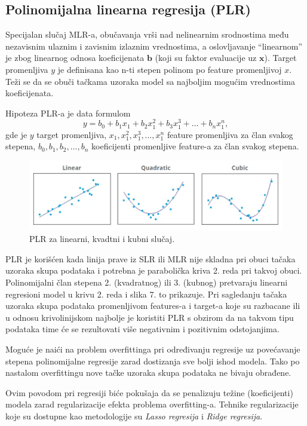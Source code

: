 \documentclass[fontsize=12bp, paper=a4]{scrarticle}
\begin{document}
\newpage
\subsection{Polinomijalna linearna regresija (PLR)}
Specijalan slučaj MLR-a, obučavanja vrši nad nelinearnim srodnostima među nezavisnim ulaznim i zavisnim izlaznim vrednostima, a oslovljavanje ``linearnom'' je zbog linearnog odnosa koeficijenata $\textbf{b}$ (koji su faktor evaluacije uz $\textbf{x}$). Target promenljiva $y$ je definisana kao n-ti stepen polinom po feature promenljivoj $x$. Teži se da se obuči tačkama uzoraka model sa najboljim mogućim vrednostima koeficijenata.

Hipoteza PLR-a je data formulom
$$ y = b_0 + b_1x_1 + b_2x_1^2 + b_3x_1^3 + \dots + b_nx_1^n,$$
gde je $y$ target promenljiva, $x_1, x_1^2, x_1^3, \dots, x_1^n$ feature promenljiva za član svakog stepena, $b_0, b_1, b_2, \dots, b_n$ koeficijenti promenljive feature-a za član svakog stepena.

\begin{figure}[h!]
    \centering
    \includegraphics[width=1\textwidth]{7.png}
    \caption{\centering PLR za linearni, kvadtni i kubni slučaj.}
\end{figure}

PLR je korišćen kada linija prave iz SLR ili MLR nije skladna pri obuci tačaka uzoraka skupa podataka i potrebna je parabolička kriva 2. reda pri takvoj obuci. Polinomijalni član stepena 2. (kvadratnog) ili 3. (kubnog) pretvaraju linearni regresioni model u krivu 2. reda i slika 7. to prikazuje. Pri sagledanju tačaka uzoraka skupa podataka promenljivom features-a i target-a koje su razbacane ili u odnosu krivolinijskom najbolje je koristiti PLR s obzirom da na takvom tipu podataka time će se rezultovati više negativnim i pozitivnim odstojanjima.

Moguće je naići na problem overfittinga pri određivanju regresije uz povećavanje stepena polinomijalne regresije zarad dostizanja sve bolji ishod modela.\cite{gfgRegr} Tako po nastalom overfittingu nove tačke uzoraka skupa podataka ne bivaju obrađene. 

Ovim povodom pri regresiji biće pokušaja da se penalizuju težine (koeficijenti) modela zarad regularizacije efekta problema overfitting-a. Tehnike regularizacije koje su dostupne kao metodologije su \textit{Lasso regresija} i \textit{Ridge regresija}.
\end{document}
